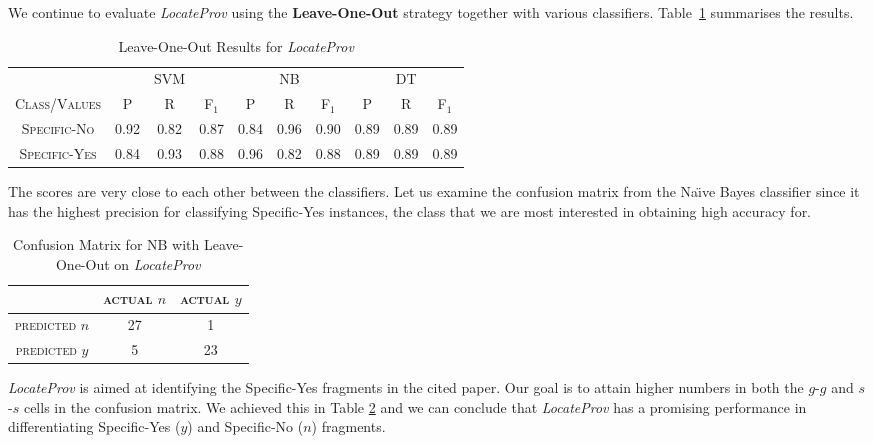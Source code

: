 We continue to evaluate \textit{LocateProv} using the \textbf{Leave-One-Out} strategy together with various classifiers. Table~\ref{tab:secondtieresults} summarises the results.

\begin{table}[h]
	\center
	\begin{tabular}{ c | c  c  c | c c c | c c c}
		& & SVM & & & NB & & & DT \\
		\textsc{Class/Values} & \textsc{P} & \textsc{R} & \textsc{F$_1$} & \textsc{P} & \textsc{R} & \textsc{F$_1$} & \textsc{P} & \textsc{R} & \textsc{F$_1$} \\
		\hline
		\textsc{Specific-No} 			& 0.92  &    0.82   &   0.87 & 0.84   &   0.96   &   0.90 & 0.89  &    0.89  &    0.89 \\
		\textsc{Specific-Yes} 			& 0.84  &    0.93   &   0.88 & 0.96   &   0.82   &   0.88 & 0.89  &    0.89  &    0.89 \\
	\end{tabular}
	\caption{Leave-One-Out Results for {\it LocateProv}}
	\label{tab:secondtieresults}
\end{table}
The scores are very close to each other between the classifiers. 
Let us examine the confusion matrix from the Na\"{\i}ve Bayes classifier since it has the highest precision for classifying Specific-Yes instances, the class that we are most interested in obtaining high accuracy for.

\begin{table}[h]
	\center
	\begin{tabular}{ c | c  c }
		 & \textsc{actual $n$} & \textsc{actual $y$} \\
		\hline
		\textsc{predicted $n$} 	& 27 & 1 \\
		\textsc{predicted $y$}		& 5 & 23
	\end{tabular}
	\caption{Confusion Matrix for NB with Leave-One-Out on {\it LocateProv}}
	\label{tab:secondnbconfusionmatrix}
\end{table}
{\it LocateProv} is aimed at identifying the Specific-Yes fragments in the cited paper. Our goal is to attain higher numbers in both the $g$-$g$ and $s$-$s$ cells in the confusion matrix. We achieved this in Table \ref{tab:secondnbconfusionmatrix} and we can conclude that {\it LocateProv} has a promising performance in differentiating Specific-Yes ($y$) and Specific-No ($n$) fragments.

